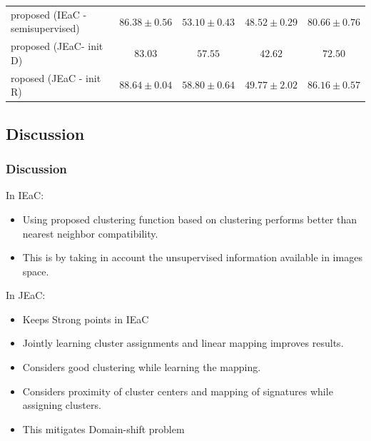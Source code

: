 \documentclass{beamer}
\begin{document}
\begin{frame}
\begin{center}
{\begin{tabular}{|l|c|c|c|c|}
   {\tiny proposed (IEaC - semisupervised)}
                          & $86.38 \pm 0.56$              & $ 53.10\pm 0.43 $             & $48.52 \pm 0.29$              &$ 80.66 \pm 0.76$ \\
   {\tiny proposed (JEaC- init D)}
                       & $83.03$                        & $57.55$                       & $42.62$          & $72.50$\\
   {\tiny roposed (JEaC - init R)}
                       & \textbf{\em $\mathbf{88.64 \pm 0.04}$}  & \textbf{\em $\mathbf{58.80 \pm 0.64}$} & $49.77 \pm 2.02$ & \textbf{\em $\mathbf{86.16 \pm 0.57}$} \\
  \hline
  \end{tabular}
  }
\end{center}

\end{frame}

\subsection{Discussion}
\label{sub:Discussion}
\begin{frame}\frametitle{Discussion}
  In IEaC:
  \begin{itemize}
    \item Using proposed clustering function based on clustering performs better than nearest neighbor compatibility.
    \item This is by taking in account the  unsupervised information available in images space.
  \end{itemize}
  In JEaC:
  \begin{itemize}
    \item Keeps Strong points in IEaC
    \item Jointly learning cluster assignments and linear mapping improves results.
    \item Considers good clustering while learning the mapping.
    \item Considers proximity of cluster centers and mapping of signatures while assigning clusters.
    \item This mitigates Domain-shift problem
  \end{itemize}
\end{frame}
\end{document}
